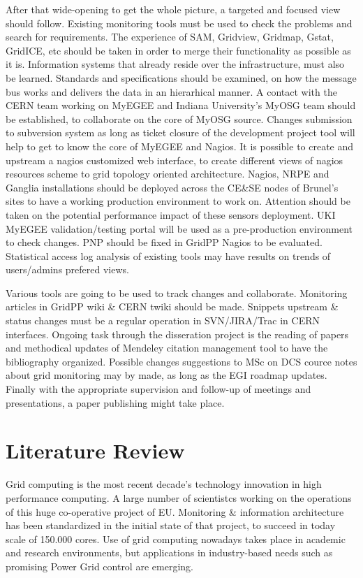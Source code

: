 After that wide-opening to get the whole picture, a targeted and focused view should follow. Existing monitoring tools must be used to check the problems and search for requirements. The experience of SAM, Gridview, Gridmap, Gstat, GridICE, etc should be taken in order to merge their functionality as possible as it is. Information systems that already reside over the infrastructure, must also be learned. Standards and specifications should be examined, on how the message bus works and delivers the data in an hierarhical manner. A contact with the CERN team working on MyEGEE and Indiana University's MyOSG team should be established, to collaborate on the core of MyOSG source. Changes submission to subversion system as long as ticket closure of the development project tool will help to get to know the core of MyEGEE and Nagios. It is possible to create and upstream a nagios customized web interface, to create different views of nagios resources scheme to grid topology oriented architecture. Nagios, NRPE and Ganglia installations should be deployed across the CE\&SE nodes of Brunel's sites to have a working production environment to work on. Attention should be taken on the potential performance impact of these sensors deployment. UKI MyEGEE validation/testing portal will be used as a pre-production environment to check changes. PNP should be fixed in GridPP Nagios to be evaluated. Statistical access log analysis of existing tools may have results on trends of users/admins prefered views.

Various tools are going to be used to track changes and collaborate. Monitoring articles in GridPP wiki \& CERN twiki should be made. Snippets upstream \& status changes must be a regular operation in SVN/JIRA/Trac in CERN interfaces. Ongoing task through the disseration project is the reading of papers and methodical updates of Mendeley citation management tool to have the bibliography organized. Possible changes suggestions to MSc on DCS cource notes about grid monitoring may by made, as long as the EGI roadmap updates. Finally with the appropriate supervision and follow-up of meetings and presentations, a paper publishing might take place.

\section{Literature Review}

Grid computing \cite{li2005grid} is the most recent decade's technology innovation in high performance computing. A large number of scientistcs working on the operations of this huge co-operative project of EU. Monitoring \& information architecture \cite{fisher2002datagrid} has been standardized in the initial state of that project, to succeed in today scale of 150.000 cores. Use of grid computing nowadays takes place in academic and research environments, but applications in industry-based needs such as promising Power Grid control \cite{Taylor2006} are emerging.

